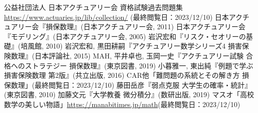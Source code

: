 \documentclass[10pt]{jsarticle}%
\begin{document}
\begin{thebibliography}{1}%
   公益社団法人 日本アクチュアリー会 資格試験過去問題集 \url{https://www.actuaries.jp/lib/collection/} (最終閲覧日：2023/12/10)
   日本アクチュアリー会『損保数理』(日本アクチュアリー会, 2011)
   日本アクチュアリー会『モデリング』(日本アクチュアリー会, 2005)
   岩沢宏和『リスク・セオリーの基礎』(培風館, 2010)
   岩沢宏和, 黒田耕嗣『アクチュアリー数学シリーズ4 損害保険数理』(日本評論社, 2015)
   MAH, 平井卓也, 玉岡一史『アクチュアリー試験 合格へのストラテジー 損保数理』(東京図書, 2019)
   小暮雅一, 東出純『例題で学ぶ損害保険数理 第2版』(共立出版, 2016)
  CAR他「難問題の系統とその解き方 損保数理」\url{}(最終閲覧日：2023/12/10)
   藤田岳彦『弱点克服 大学生の確率・統計』(東京図書, 2010)
   加藤文元『大学教養 微分積分』(数研出版, 2019)
   マスオ「高校数学の美しい物語」\url{https://manabitimes.jp/math}(最終閲覧日：2023/12/10)
\end{thebibliography}
\end{document}
